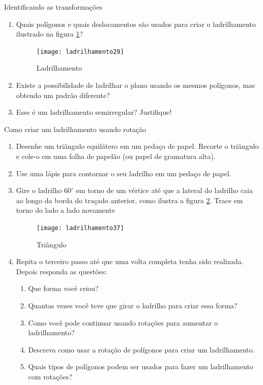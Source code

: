 \begin{task}{Identificando as transformações}

\begin{enumerate}
	\item Quais polígonos e quais deslocamentos são usados para criar o ladrilhamento ilustrado na figura \ref{transf3}?
	
	\begin{figure}[H]
	\centering
	\texttt{[image: ladrilhamento29]}
	\label{transf3}
	\caption{Ladrilhamento}
	\end{figure}
	
	\item Existe a possibilidade de ladrilhar o plano usando os mesmos polígonos,  mas obtendo um padrão diferente?
	\item Esse é um ladrilhamento semirregular? Justifique!
\end{enumerate}
\end{task}


\begin{task}{Como criar um ladrilhamento usando rotação}

\begin{enumerate}
	\item Desenhe um triângulo equilátero em um pedaço de papel. Recorte o triângulo e cole-o em uma folha de papelão (ou papel de gramatura alta).
	\item Use uma lápis para contornar o seu ladrilho em um pedaço de papel.
	\item Gire o ladrilho $60^{\circ}$ em torno de um vértice até que a lateral do ladrilho caia ao longo da borda do traçado anterior, como ilustra a figura \ref{transf4}. Trace em torno do lado a lado novamente

	\begin{figure}[H]
	\centering
	\texttt{[image: ladrilhamento37]}
\label{transf4}
\caption{Triângulo}
	\end{figure}

	\item Repita o terceiro passo até que uma volta completa tenha sido realizada. Depois responda as questões:
	\begin{enumerate}
		\item Que forma você criou?
		\item Quantas vezes você teve que girar o ladrilho para criar essa forma?
		\item Como você pode continuar usando rotações para aumentar o ladrilhamento?
		\item Descreva como usar a rotação de polígonos para criar um ladrilhamento.
	\item Quais tipos de polígonos podem ser usados para fazer um ladrilhamento com rotações?
		
	\end{enumerate}

	
\end{enumerate}

\end{task}

